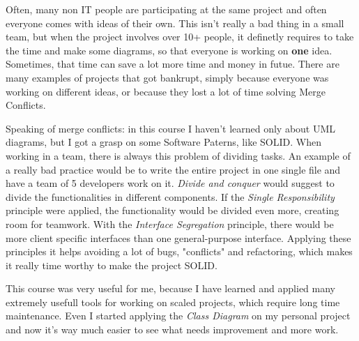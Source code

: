 \documentclass{article}
\begin{document}
		Often, many non IT people are participating at the same project and often everyone comes with ideas of their own. This isn't really a bad thing in a small team, but when the project involves over 10+ people, it definetly requires to take the time and make some diagrams, so that everyone is working on \textbf{one} idea. Sometimes, that time can save a lot more time and money in futue. There are many examples of projects that got bankrupt, simply because everyone was working on different ideas, or because they lost a lot of time solving Merge Conflicts.

		Speaking of merge conflicts: in this course I haven't learned only about UML diagrams, but I got a grasp on some Software Paterns, like SOLID. When working in a team, there is always this problem of dividing tasks. An example of a really bad practice would be to write the entire project in one single file and have a team of 5 developers work on it. \textit{Divide and conquer} would suggest to divide the functionalities in different components. If the \textit{Single Responsibility} principle were applied, the functionality would be divided even more, creating room for teamwork. With the \textit{Interface Segregation} principle, there would be more client specific interfaces than one general-purpose interface. Applying these principles it helps avoiding a lot of bugs, "conflicts" and refactoring, which makes it really time worthy to make the project SOLID.

		This course was very useful for me, because I have learned and applied many extremely usefull tools for working on scaled projects, which require long time maintenance. Even I started applying the \textit{Class Diagram} on my personal project and now it's way much easier to see what needs improvement and more work.
\end{document}
